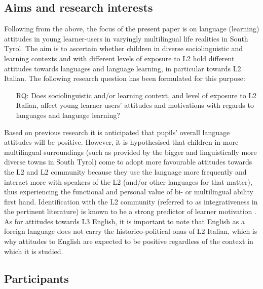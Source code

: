 \documentclass[output=paper]{../langscibook}
\begin{document}
\subsection{Aims and research interests}


Following from the above, the focus of the present paper is on language (learning) attitudes in young learner-users in varyingly multilingual life realities in South Tyrol. The aim is to ascertain whether children in diverse sociolinguistic and learning contexts and with different levels of exposure to L2 hold different attitudes towards languages and language learning, in particular towards L2 Italian. The following research question has been formulated for this purpose:

\begin{itemize}
\item [RQ:] Does sociolinguistic and/or learning context, and level of exposure to L2 Italian, affect young learner-users’ attitudes and motivations with regards to languages and language learning?
\end{itemize}

Based on previous research it is anticipated that pupils’ overall language attitudes will be positive. However, it is hypothesised that children in more multilingual surroundings (such as provided by the bigger and linguistically more diverse towns in South Tyrol) come to adopt more favourable attitudes towards the L2 and L2 community because they use the language more frequently and interact more with speakers of the L2 (and/or other languages for that matter), thus experiencing the functional and personal value of bi- or multilingual ability first hand.  Identification with the L2 community (referred to as integrativeness in the pertinent literature) is known to be a strong predictor of learner motivation \citep{Gardner1985}. As for attitudes towards L3 English, it is important to note that English as a foreign language does not carry the historico-political onus of L2 Italian, which is why attitudes to English are expected to be positive regardless of the context in which it is studied.

\subsection{Participants}
\end{document}
